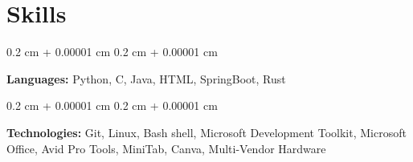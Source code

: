 \documentclass[10pt, letterpaper]{article}
\newenvironment{onecolentry}{
    \begin{adjustwidth}{
        0.2 cm + 0.00001 cm
    }{
        0.2 cm + 0.00001 cm
    }
}{
    \end{adjustwidth}
} %
\begin{document}
        \endgroup
    
    \section{Skills}



        
        \begin{onecolentry}
            \textbf{Languages:} Python, C, Java, HTML, SpringBoot, Rust \end{onecolentry}      
                \vspace{0.1 cm}
        \begin{onecolentry}
            \textbf{Technologies:} Git, Linux, Bash shell, Microsoft Development Toolkit, Microsoft Office, Avid Pro Tools, MiniTab, Canva, Multi-Vendor Hardware \end{onecolentry}
        \vspace{0.05 cm}
\end{document}
